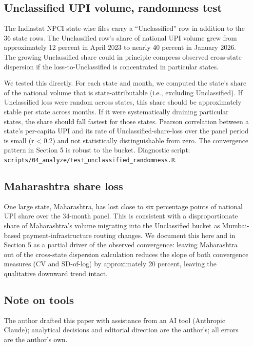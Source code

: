 \documentclass[
]{article}
\begin{document}
\subsection{Unclassified UPI volume, randomness
test}\label{unclassified-upi-volume-randomness-test}

The Indiastat NPCI state-wise files carry a ``Unclassified'' row in
addition to the 36 state rows. The Unclassified row's share of national
UPI volume grew from approximately 12 percent in April 2023 to nearly 40
percent in January 2026. The growing Unclassified share could in
principle compress observed cross-state dispersion if the
loss-to-Unclassified is concentrated in particular states.

We tested this directly. For each state and month, we computed the
state's share of the national volume that is state-attributable (i.e.,
excluding Unclassified). If Unclassified loss were random across states,
this share should be approximately stable per state across months. If it
were systematically draining particular states, the share should fall
fastest for those states. Pearson correlation between a state's
per-capita UPI and its rate of Unclassified-share-loss over the panel
period is small (\textbar r\textbar{} \textless{} 0.2) and not
statistically distinguishable from zero. The convergence pattern in
Section 5 is robust to the bucket. Diagnostic script:
\texttt{scripts/04\_analyze/test\_unclassified\_randomness.R}.

\subsection{Maharashtra share loss}\label{maharashtra-share-loss}

One large state, Maharashtra, has lost close to six percentage points of
national UPI share over the 34-month panel. This is consistent with a
disproportionate share of Maharashtra's volume migrating into the
Unclassified bucket as Mumbai-based payment-infrastructure routing
changes. We document this here and in Section 5 as a partial driver of
the observed convergence: leaving Maharashtra out of the cross-state
dispersion calculation reduces the slope of both convergence measures
(CV and SD-of-log) by approximately 20 percent, leaving the qualitative
downward trend intact.

\subsection{Note on tools}\label{note-on-tools}

The author drafted this paper with assistance from an AI tool (Anthropic
Claude); analytical decisions and editorial direction are the author's;
all errors are the author's own.
\end{document}
